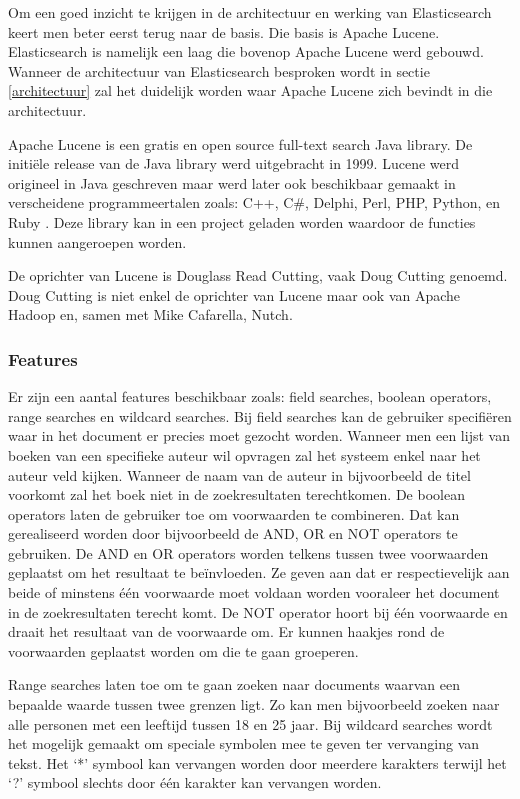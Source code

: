 Om een goed inzicht te krijgen in de architectuur en werking van Elasticsearch keert men beter eerst terug naar de basis. Die basis is Apache Lucene. Elasticsearch is namelijk een laag die bovenop Apache Lucene werd gebouwd. Wanneer de architectuur van Elasticsearch besproken wordt in sectie \ref{architectuur} zal het duidelijk worden waar Apache Lucene zich bevindt in die architectuur.

Apache Lucene is een gratis en open source full-text search Java library. De initiële release van de Java library werd uitgebracht in 1999. Lucene werd origineel in Java geschreven maar werd later ook beschikbaar gemaakt in verscheidene programmeertalen zoals: C++, C\#, Delphi, Perl, PHP, Python, en Ruby \autocite{Whissel2009}. Deze library kan in een project geladen worden waardoor de functies kunnen aangeroepen worden.

De oprichter van Lucene is Douglass Read Cutting, vaak Doug Cutting genoemd. Doug Cutting is niet enkel de oprichter van Lucene maar ook van Apache Hadoop en, samen met Mike Cafarella, Nutch.

\subsubsection{Features}

Er zijn een aantal features beschikbaar zoals: field searches, boolean operators, range searches en wildcard searches. Bij field searches kan de gebruiker specifiëren waar in het document er precies moet gezocht worden. Wanneer men een lijst van boeken van een specifieke auteur wil opvragen zal het systeem enkel naar het auteur veld kijken. Wanneer de naam van de auteur in bijvoorbeeld de titel voorkomt zal het boek niet in de zoekresultaten terechtkomen. De boolean operators laten de gebruiker toe om voorwaarden te combineren. Dat kan gerealiseerd worden door bijvoorbeeld de AND, OR en NOT operators te gebruiken. De AND en OR operators worden telkens tussen twee voorwaarden geplaatst om het resultaat te beïnvloeden. Ze geven aan dat er respectievelijk aan beide of minstens één voorwaarde moet voldaan worden vooraleer het document in de zoekresultaten terecht komt. De NOT operator hoort bij één voorwaarde en draait het resultaat van de voorwaarde om. Er kunnen haakjes rond de voorwaarden geplaatst worden om die te gaan groeperen.

Range searches laten toe om te gaan zoeken naar documents waarvan een bepaalde waarde tussen twee grenzen ligt. Zo kan men bijvoorbeeld zoeken naar alle personen met een leeftijd tussen 18 en 25 jaar. Bij wildcard searches wordt het mogelijk gemaakt om speciale symbolen mee te geven ter vervanging van tekst. Het ‘*’ symbool kan vervangen worden door meerdere karakters terwijl het ‘?’ symbool slechts door één karakter kan vervangen worden.

